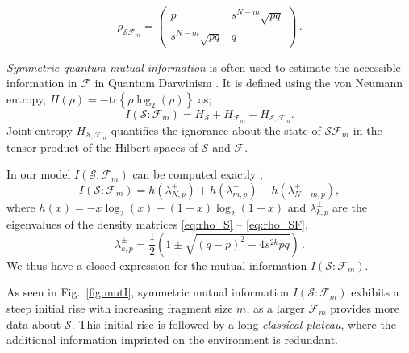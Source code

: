 \documentclass[aps,prl,showpacs,amsmath,amssymb,amsfonts,lengthcheck,twocolumn,longbibliography,superscriptaddress]{revtex4-2}
\newcommand{\cS}        {{\mathcal S}}
\newcommand{\+}         {\dagger}
\newcommand\cF{{\mathcal F}}
\newcommand{\tr}[1]{\mathrm{tr}\left\{#1\right\}}
\newcommand{\mc}[1]{\mathcal{#1}}
\begin{document}
\begin{equation}
\label{eq:rho_SF}
\rho_{\mathcal{S}\mathcal{F}_m}=
\begin{pmatrix}
p & s^{N-m}\sqrt{pq}  \\
s^{N-m}\sqrt{pq}  & q
\end{pmatrix}\,.
\end{equation}

{\it Symmetric quantum mutual information}
is often used to estimate the accessible information in $\cF$ in
 Quantum Darwinism \cite{Zurek2003RMP,Ollivier2004PRL,Ollivier2005PRA,blume2006quantum,Riedel2010PRL,Riedel2011NJP,Campbell2019PRA,Ryan2020,Garcia2020PRR}. It is defined using the von Neumann entropy, $H(\rho)=-\tr{\rho \log_{2}(\rho)}$ as;
\begin{equation}
{I}(\mc{S}:\mc{F}_m)=H_{\mc{S}}+H_{\mc{F}_m}-H_{\mc{S},\mc{F}_m}.
\label{MUTI}
\end{equation}
Joint entropy $H_{\mc{S},\mc{F}_m}$ quantifies the ignorance about the state of ${\mc{S}\mc{F}_m}$ in the tensor product of the Hilbert spaces of $\cS$ and $\cF$. 

In our model ${I}(\mc{S}:\mc{F}_m)$ can be computed exactly \cite{ZQZ10};
\begin{equation}
{I}(\mc{S}:\mc{F}_m)={h}(\lambda^{+}_{N,p})+{h}(\lambda^{+}_{m,p})-{h}(\lambda^{+}_{N-m,p}),
\label{mutinfo}
\end{equation}
where ${h}(x)=-x \log_2(x)-(1-x) \log_2(1-x)$ and $\lambda^{\pm}_{k,p}$ are the eigenvalues of the density matrices \eqref{eq:rho_S} -- \eqref{eq:rho_SF},
\begin{equation}
\lambda^{\pm}_{k,p}=\frac{1}{2}\left(1 \pm \sqrt{\left(q-p\right)^{2}+4s^{2k}pq}\right)\,.
\label{root}
\end{equation}
We thus have a closed expression for the mutual information ${I}(\mc{S}:\mc{F}_m)$.


As seen in Fig.~\ref{fig:mutI}, symmetric mutual information ${I}(\mc{S}:\mc{F}_m)$ exhibits a steep initial rise with increasing fragment size $m$, as a larger $\cF_m$ provides more data about $\cS$. This initial rise is followed by a long \emph{classical plateau}, where the additional information imprinted on the environment is redundant.  
\end{document}
